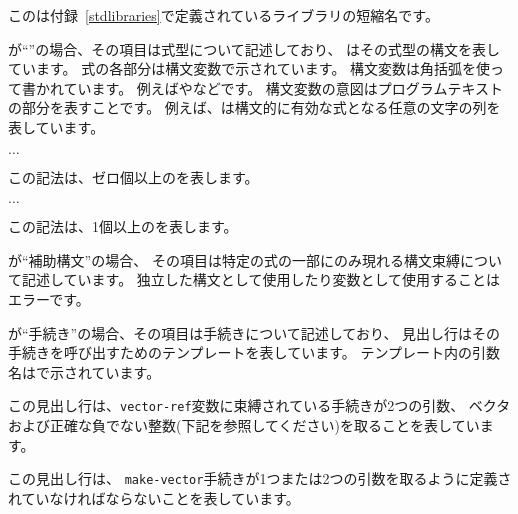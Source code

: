 このは付録~\ref{stdlibraries}で定義されているライブラリの短縮名です。

が``\exprtype''の場合、その項目は式型について記述しており、
はその式型の構文を表しています。
式の各部分は構文変数で示されています。
構文変数は角括弧を使って書かれています。
例えばやなどです。
構文変数の意図はプログラムテキストの部分を表すことです。
例えば、は構文的に有効な式となる任意の文字の列を表しています。
\begin{tabbing}
\qquad {} $\ldots$
\end{tabbing}
この記法は、ゼロ個以上のを表します。
\begin{tabbing}
\qquad {}  $\ldots$
\end{tabbing}
この記法は、1個以上のを表します。

が``補助構文''の場合、
その項目は特定の式の一部にのみ現れる構文束縛について記述しています。
独立した構文として使用したり変数として使用することはエラーです。

が``手続き''の場合、その項目は手続きについて記述しており、
見出し行はその手続きを呼び出すためのテンプレートを表しています。
テンプレート内の引数名はで示されています。

\noindent{}\unpenalty

この見出し行は、{\tt vector-ref}変数に束縛されている手続きが2つの引数、
ベクタおよび正確な負でない整数(下記を参照してください)を取ることを表しています。

\noindent%
\unpenalty

この見出し行は、
{\tt make-vector}手続きが1つまたは2つの引数を取るように定義されていなければならないことを表しています。

